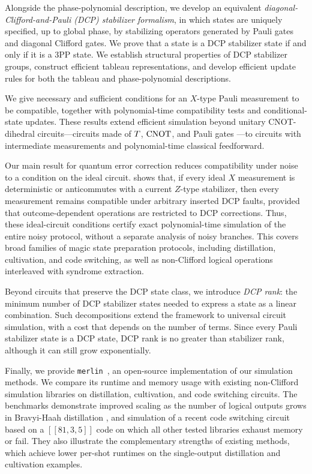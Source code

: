 Alongside the phase-polynomial description, we develop an equivalent \emph{diagonal-Clifford-and-Pauli (DCP) stabilizer formalism}, in which states are uniquely specified, up to global phase, by stabilizing operators generated by Pauli gates and diagonal Clifford gates. We prove that a state is a DCP stabilizer state if and only if it is a 3PP state. We establish structural properties of DCP stabilizer groups, construct efficient tableau representations, and develop efficient update rules for both the tableau and phase-polynomial descriptions.

We give necessary and sufficient conditions for an $X$-type Pauli measurement to be compatible, together with polynomial-time compatibility tests and conditional-state updates. These results extend efficient simulation beyond unitary CNOT-dihedral circuits---circuits made of $T$, $\operatorname{CNOT}$, and Pauli gates \cite{cross2016scalable}---to circuits with intermediate measurements and polynomial-time classical feedforward.

Our main result for quantum error correction reduces compatibility under noise to a condition on the ideal circuit.
 shows that, if every ideal $X$ measurement is deterministic or anticommutes with a current $Z$-type stabilizer, then every measurement remains compatible under arbitrary inserted DCP faults, provided that outcome-dependent operations are restricted to DCP corrections.
Thus, these ideal-circuit conditions certify exact polynomial-time simulation of the entire noisy protocol, without a separate analysis of noisy branches.
This covers broad families of magic state preparation protocols, including distillation, cultivation, and code switching, as well as non-Clifford logical operations interleaved with syndrome extraction.

Beyond circuits that preserve the DCP state class, we introduce \emph{DCP rank}: the minimum number of DCP stabilizer states needed to express a state as a linear combination. Such decompositions extend the framework to universal circuit simulation, with a cost that depends on the number of terms. Since every Pauli stabilizer state is a DCP state, DCP rank is no greater than stabilizer rank, although it can still grow exponentially.

Finally, we provide \texttt{merlin}~\cite{koch2026merlin}, an open-source implementation of our simulation methods. We compare its runtime and memory usage with existing non-Clifford simulation libraries on distillation, cultivation, and code switching circuits.
The benchmarks demonstrate improved scaling as the number of logical outputs grows in Bravyi-Haah distillation \cite{bravyi2012magic}, and simulation of a recent code switching circuit based on a $[[81,3,5]]$ code \cite{li2026transversal} on which all other tested libraries exhaust memory or fail.
They also illustrate the complementary strengths of existing methods, which achieve lower per-shot runtimes on the single-output distillation and cultivation examples.

